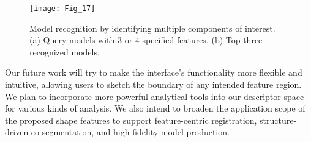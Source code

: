 \begin{figure}[!to]
\begin{center}
\texttt{[image: Fig\_17]}
\end{center}
\caption[Model recognition by identifying multiple components.]
 {Model recognition by identifying multiple components of
 interest. (a) Query models with 3 or 4 specified features.
  (b) Top three recognized models.}
\label{recognition}
\end{figure}

Our future work will try to make the interface's functionality more
flexible and intuitive, allowing users to sketch the boundary of any
intended feature region. We plan to incorporate more powerful
analytical tools into our descriptor space for various kinds of
analysis. We also intend to broaden the application scope of the
proposed shape features to support feature-centric registration,
structure-driven co-segmentation, and high-fidelity model production. 